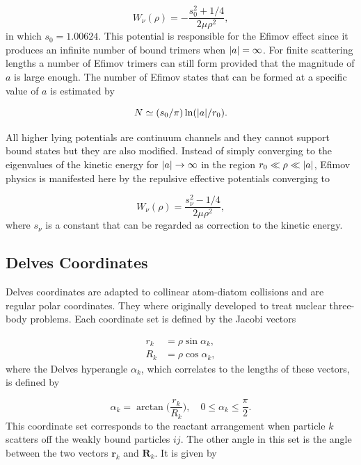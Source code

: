 \begin{equation}
W_{\nu}(\rho) = -\frac{s_0^2+1/4}{2\mu \rho^2},
\end{equation} 
in which $s_0 = 1.00624$. This potential is responsible for the Efimov effect since it produces an infinite number of bound trimers when $\lvert a\rvert = \infty$. For finite scattering lengths a number of Efimov trimers can still form provided that the magnitude of $a$ is large enough. The number of Efimov states that can be formed at a specific value of $a$ is estimated by

\begin{equation}
N \simeq (s_0/\pi)\ln(\lvert a\rvert/r_0).
\end{equation}

All higher lying potentials are continuum channels and they cannot support bound states but they are also modified. Instead of simply converging to the eigenvalues of the kinetic energy for $\lvert a\rvert \rightarrow \infty$ in the region $r_0 \ll \rho \ll \lvert a\rvert$, Efimov physics is manifested here by the repulsive effective potentials converging to 

\begin{equation}
W_{\nu}(\rho) = \frac{s_{\nu}^2-1/4}{2\mu \rho^2},
\end{equation} 
where $s_{\nu}$ is a constant that can be regarded as correction to the kinetic energy. 
 
\subsection{Delves Coordinates}\label{delvescoord}
Delves coordinates are adapted to collinear atom-diatom collisions and are regular polar coordinates. They where originally developed to treat nuclear three-body problems. Each coordinate set is defined by the Jacobi vectors

\begin{align}
r_{k} &= \rho \sin{\alpha_{k}},\\
R_{k} &= \rho \cos{\alpha_{k}},
\end{align}
where the Delves hyperangle $\alpha_{k}$, which correlates to the lengths of these vectors, is defined by

\begin{equation}
\alpha_{k} = \arctan\bigg(\frac{r_{k}}{R_{k}}\bigg), \quad 0\leq \alpha_{k} \leq \frac{\pi}{2}.
\end{equation}
This coordinate set corresponds to the reactant arrangement when particle $k$ scatters off the weakly bound particles $ij$. The other angle in this set is the angle between the two vectors $\mathbf{r}_{k}$ and $\mathbf{R}_{k}$. It is given by

